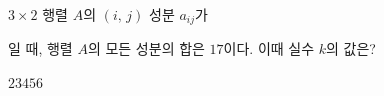 $3\times 2$ 행렬 $A$의 $(i,\,j)$ 성분 $a_{ij}$가 \par\smallskip{}\par\smallskip\noindent 일 때, 행렬 $A$의 모든 성분의 합은 $17$이다. 이때 실수 $k$의 값은?
\begin{choices32}{$2$}{$3$}{$4$}{$5$}{$6$}\end{choices32}
